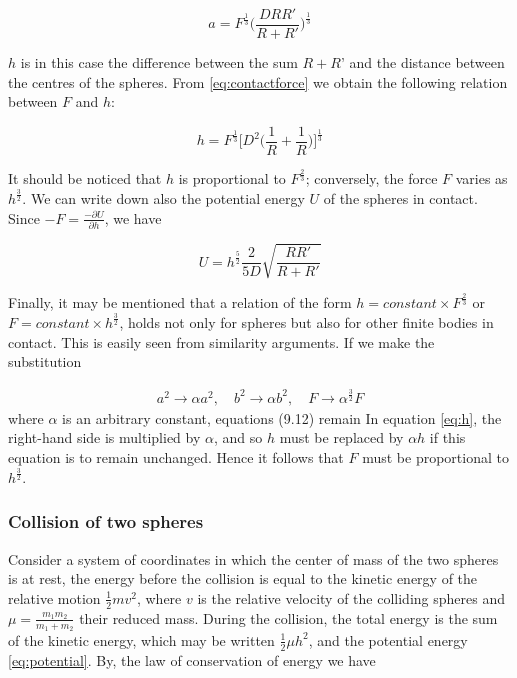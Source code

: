 \begin{equation}
a = F^{\frac{1}{3}} \Big(\frac{DRR'}{R+R'} \Big)^{\frac{1}{3}}
\end{equation}

$h$ is in this case the difference between the sum $R+R’$ and the distance between the centres of the spheres. From \ref{eq:contactforce} we obtain the following relation between $F$ and $h$:

\begin{equation}
h = F^{\frac{1}{3}} \Big[ D^{2} \Big( \frac{1}{R} + \frac{1}{R} \Big) \Big]^{\frac{1}{3}}
\end{equation}

It should be noticed that $h$ is proportional to $F^{\frac{2}{3}}$; conversely, the force $F$ varies as $h^{\frac{3}{2}}$. We can write down also the potential energy $U$ of the spheres
in contact. Since $ -F = \frac{-\partial U}{\partial h}$, we have

\begin{equation}
U = h^{\frac{5}{2}} \frac{2}{5D} \sqrt{\frac{RR'}{R+R'}}
\label{eq:potential}
\end{equation}

Finally, it may be mentioned that a relation of the form $h = constant \times F^{\frac{2}{3}}$ or $F = constant \times h^{\frac{3}{2}}$, holds not only for spheres but also for other finite bodies in contact. This is easily seen from similarity arguments. If we make
the substitution

\begin{align*}
a^{2} \rightarrow \alpha a^{2}, \quad b^{2} \rightarrow \alpha b^{2}, \quad F \rightarrow \alpha^{\frac{3}{2}}F
\end{align*}
where $\alpha$ is an arbitrary constant, equations (9.12) remain  In
equation \ref{eq:h}, the right-hand side is multiplied by $\alpha$, and so $h$ must be replaced by $\alpha h$ if this equation is to remain unchanged. Hence it follows that $F$ must be proportional to $h^{\frac{3}{2}}$.



\subsubsection{Collision of two spheres}


Consider a system of coordinates in which the center of mass of the two spheres is at rest, the energy before the collision is equal to the kinetic energy of the relative motion $\frac{1}{2}mv^{2}$, where $v$ is the relative velocity of the colliding spheres and $\mu = \frac{m_{1}m_{2}}{m_{1} + m_{2}}$ their reduced mass. During the collision, the total energy is the sum of the kinetic energy, which may be written $\frac{1}{2}\mu h^{2}$, and the potential energy \ref{eq:potential}. By, the law of conservation of energy we have

